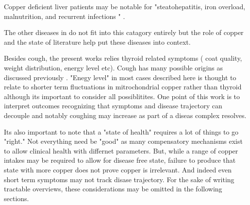 Copper deficient liver patients 
may be  notable for
"steatohepatitis, iron overload, malnutrition, and recurrent infections "
\cite{Yu_Liou_Biggins_Copper_Deficiency_Liver_2019}.

The other diseases in  do not fit into
this catagory entirely but the role of copper and the state
of literature help put these diseases into context. 

Besides cough, the present works relies  thyroid related
symptoms ( coat quality, weight distribution, energy level etc).
Cough has many possible origins as discussed previously
\cite{mmarchywka-MJM-2019-001-.1rg}.  "Enegy level"
in most cases described here is thought to relate to 
shorter term fluctuations in mitrochondrial copper
rather than thyroid although its important to consider
all possiblitites. One point of this work is to 
interpret outcomes recognizing that symptoms and disease
trajectory can decouple and notably coughing may increase
as part of a diseas complex resolves.   

Its also important to note that a "state of health" requires
a lot of things to go "right." Not everything need be
"good" as many compensatory mechanisms exist to allow
clinical health with differnet parameters. But, while
a range of copper intakes may be required to allow for
disease free state, failure to produce that state with 
more copper does not prove copper is irrelevant.
And indeed even short term symptoms may not track
disase trajectory. For the sake of writing tractable
overviews, these considerations may be omitted in the following
sections. 




